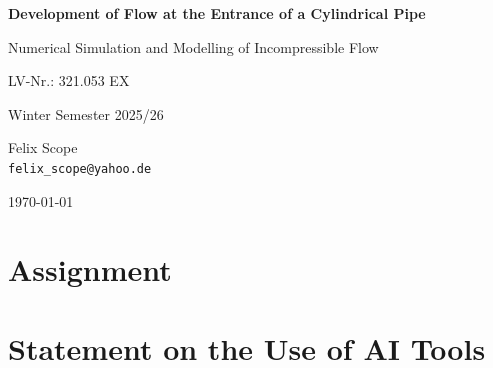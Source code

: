 \documentclass[12pt,a4paper]{article}
\begin{document}
\begin{titlepage}
    \centering
    \vspace*{2cm}

    {\Huge\bfseries Development of Flow at the Entrance of a Cylindrical Pipe\par}

    \vspace{1.5cm}

    {\Large Numerical Simulation and Modelling of Incompressible Flow\par}

    \vspace{1cm}

    {\large LV-Nr.: 321.053 EX\par}
    {\large Winter Semester 2025/26\par}

    \vfill

    {\Large
    Felix Scope\\
    \texttt{felix\_scope@yahoo.de}\\
    }

    \vfill

    {\large \today\par}
\end{titlepage}

\tableofcontents
\newpage

\section*{Assignment}


\newpage

\section*{Statement on the Use of AI Tools}
\end{document}
